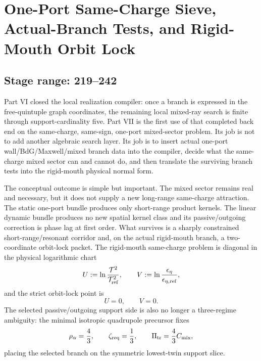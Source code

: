 \chapter[Same-Charge Sieve and Rigid-Mouth Orbit Lock]{One-Port Same-Charge Sieve, Actual-Branch Tests, and Rigid-Mouth Orbit Lock}
\label{chap:part07_same_charge_rigid_mouth}

\section*{Stage range: 219--242}

Part VI closed the local realization compiler: once a branch is expressed in the free-quintuple graph coordinates, the remaining local mixed-ray search is finite through support-cardinality five.  Part VII is the first use of that completed back end on the same-charge, same-sign, one-port mixed-sector problem.  Its job is not to add another algebraic search layer.  Its job is to insert actual one-port wall/BdG/Maxwell/mixed branch data into the compiler, decide what the same-charge mixed sector can and cannot do, and then translate the surviving branch tests into the rigid-mouth physical normal form.

The conceptual outcome is simple but important.  The mixed sector remains real and necessary, but it does not supply a new long-range same-charge attraction.  The static one-port bundle produces only short-range product kernels.  The linear dynamic bundle produces no new spatial kernel class and its passive/outgoing correction is phase lag at first order.  What survives is a sharply constrained short-range/resonant corridor and, on the actual rigid-mouth branch, a two-coordinate orbit-lock packet.  The rigid-mouth same-charge problem is diagonal in the physical logarithmic chart
\begin{equation}
\label{eq:part07-intro-uv-chart}
U:=\ln\frac{\mathcal T^2}{\mathcal T_{\rm ref}^2},
\qquad
V:=\ln\frac{\epsilon_\eta}{\epsilon_{\eta,\rm ref}},
\end{equation}
and the strict orbit-lock point is
\begin{equation}
\label{eq:part07-intro-orbit-lock}
U=0,
\qquad
V=0.
\end{equation}
The selected passive/outgoing support side is also no longer a three-regime ambiguity: the minimal isotropic quadrupole precursor fixes
\begin{equation}
\label{eq:part07-intro-selected-twin-slice}
\rho_\alpha=\frac43,
\qquad
\zeta_{\rm req}=\frac13,
\qquad
\Pi_{\rm tr}=\frac43 C_{\rm mix},
\end{equation}
placing the selected branch on the symmetric lowest-twin support slice.

